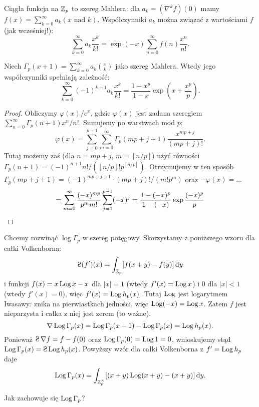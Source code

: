 Ciągła funkcja na $\mathbb Z_p$ to szereg Mahlera: dla $a_k = (\nabla^k f)(0)$ mamy $f(x) = \sum_{k=0}^\infty a_k (x\mbox{ nad }k)$.
Współczynniki $a_k$ można związać z wartościami $f$ (jak wcześniej!):
\[
	\sum_{k=0}^\infty a_k \frac{x^k}{k!} = \exp (-x) \sum_{n=0}^\infty f(n) \frac{x^n}{n!}.
\]

\begin{fakt}
	Niech $\Gamma_p(x+1) = \sum_{k=0}^\infty a_k {x \choose k}$ jako szereg Mahlera.
	Wtedy jego współczynniki spełniają zależność:
	\[
		\sum_{k=0}^\infty (-1)^{k+1} a_k \frac{x^k}{k!}= \frac{1-x^p}{1-x} \exp \left(x + \frac{x^p}p\right).
	\]
\end{fakt}

\begin{proof}
	Obliczymy $\varphi(x)/e^x$, gdzie $\varphi(x)$ jest zadana szeregiem $\sum_{n=0}^\infty \Gamma_p(n+1)x^n/n!$.
	Sumujemy po warstwach mod $p$:
	\[
		\varphi(x) = \sum_{j=0}^{p-1} \sum_{m=0}^\infty \Gamma_p(mp+j+1) \frac{x^{mp+j}}{(mp+j)!}.
	\]
	Tutaj możemy zaś (dla $n = mp+j$, $m = [n/p]$) użyć równości $\Gamma_p(n+1) = {(-1)^{n+1}n!}/ ([n/p]! p^{[n/p]})$.
	Otrzymujemy w ten sposób $\Gamma_p(mp+j+1) = (-1)^{mp+j+1}\cdot (mp+j)! / (m!p^m)$ oraz $- \varphi(x) = \ldots$
	\[
		= \sum_{m=0}^\infty \frac{(-x)^{mp}}{p^m m!}  \sum_{j=0}^{p-1} (-x)^j \\
		= \frac {1- (-x)^p}{1-(-x)} \exp \frac{(-x)^p}{p} \qedhere
	\]
\end{proof}

Chcemy rozwinąć $\log \Gamma_p$ w szereg potęgowy.
Skorzystamy z poniższego wzoru dla całki Volkenborna:
\[
	\suma (f')(x) = \int_{\Z_p} [f(x+y) - f(y)] \,\textrm{d}y
\]
i funkcji $f(x) = x \operatorname{Log} x - x$ dla $|x| = 1$ (wtedy $f'(x) = \operatorname{Log} x$) i $0$ dla $|x| < 1$ (wtedy $f'(x) = 0$), więc $f'(x) = \operatorname{Log} h_p(x)$.
Tutaj $\operatorname{Log}$ jest logarytmem Iwasawy: znika na pierwiastkach jedności, więc $\operatorname{Log}(-x) = \operatorname{Log} x$.
Zatem $f$ jest nieparzysta i całka z niej jest zerem (to ważne).
\[
	\nabla \operatorname{Log} \Gamma_p(x) = \operatorname{Log} \Gamma_p(x+1) - \operatorname{Log} \Gamma_p(x) = \operatorname{Log} h_p(x).
\]
Ponieważ $\suma \nabla f = f -f(0)$ oraz $\operatorname{Log} \Gamma_p(0) = \operatorname{Log} 1 = 0$, wnioskujemy stąd $\iwasawa \Gamma_p(x) = \suma \iwasawa h_p(x)$.
Powyższy wzór dla całki Volkenborna z $f' = \operatorname{Log} h_p$ daje
\begin{align*}
	\operatorname{Log} \Gamma_p(x) = \int_{\mathbb Z_p^\times} [(x+y)\operatorname{Log}(x+y) - (x+y)] \,\textrm{d}y.
\end{align*}


Jak zachowuje się $\operatorname{Log} \Gamma_p$?

